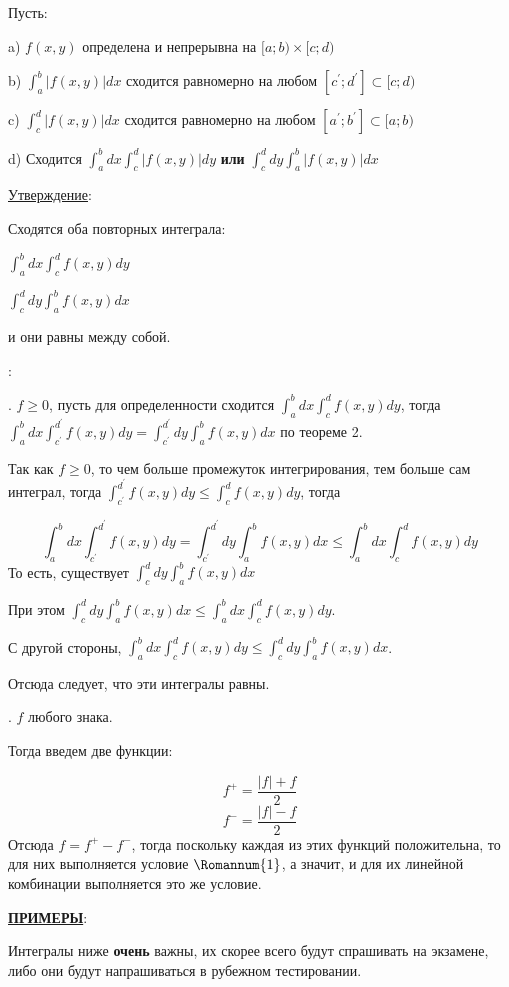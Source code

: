 \documentclass[12pt]{article}
\begin{document}
Пусть:\par
a) $f(x,y)$ определена и непрерывна на $[a;b) \times [c;d)$\par
b) $\int_a^b |f(x,y) |dx$ сходится равномерно на любом $[c^{'};d^{'}] \subset [c;d)$\par
c) $\int_c^d |f(x,y) |dx$ сходится равномерно на любом $[a^{'};b^{'}] \subset [a;b)$\par 
d) Сходится $\int_a^b dx \int_c^d |f(x,y)|dy$ \textbf{или} $\int_c^d dy \int_a^b |f(x,y)|dx$\par
\uline{Утверждение}:\par
Сходятся оба повторных интеграла:\par
\indent $\int_a^b dx \int_c^d f(x,y) dy$\par
\indent $\int_c^d dy \int_a^b f(x,y) dx$\par
и они равны между собой.\par
{}:\par
{}. $f \geq 0$, пусть для определенности сходится $\int_a^b dx \int_c^d f(x,y) dy$, тогда $\int_a^b dx \int_{c^{'}}^{d^{'}} f(x,y) dy = \int_{c^{'}}^{d^{'}} dy \int_a^b f(x,y) dx$ по теореме 2.\par
Так как $f \geq 0$, то чем больше промежуток интегрирования, тем больше сам интеграл, тогда $\int_{c^{'}}^{d^{'}} f(x,y) dy \leq \int_c^d f(x,y) dy$, тогда\par
$$\int_a^b dx \int_{c^{'}}^{d^{'}} f(x,y) dy = \int_{c^{'}}^{d^{'}} dy \int_a^b f(x,y) dx \leq \int_a^b dx \int_c^d f(x,y) dy$$
То есть, существует $\int_c^d dy \int_a^b f(x,y) dx$\par
При этом $\int_c^d dy \int_a^b f(x,y) dx \leq \int_a^b dx \int_c^d f(x,y) dy$.\par
С другой стороны, $\int_a^b dx \int_c^d f(x,y) dy \leq \int_c^d dy \int_a^b f(x,y) dx$.\par
Отсюда следует, что эти интегралы равны.\par
{}. $f$ любого знака.\par
Тогда введем две функции:\par
$$f^{+} = \frac{|f| + f}{2}$$
$$f^{-} = \frac{|f| - f}{2}$$
Отсюда $f = f^{+} - f^{-}$, тогда поскольку каждая из этих функций положительна, то для них выполняется условие $\Romannum{1}$, а значит, и для их линейной комбинации выполняется это же условие.\par
\uline{\textbf{ПРИМЕРЫ}}:\par
Интегралы ниже \textbf{очень} важны, их скорее всего будут спрашивать на экзамене, либо они будут напрашиваться в рубежном тестировании.\par
\end{document}
